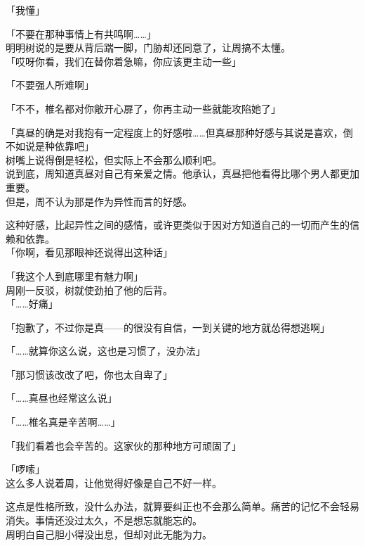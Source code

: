 「我懂」

「不要在那种事情上有共鸣啊……」\\

明明树说的是要从背后踹一脚，门胁却还同意了，让周搞不太懂。\\

「哎呀你看，我们在替你着急嘛，你应该更主动一些」

「不要强人所难啊」

「不不，椎名都对你敞开心扉了，你再主动一些就能攻陷她了」

「真昼的确是对我抱有一定程度上的好感啦……但真昼那种好感与其说是喜欢，倒不如说是种依靠吧」\\

树嘴上说得倒是轻松，但实际上不会那么顺利吧。\\

说到底，周知道真昼对自己有亲爱之情。他承认，真昼把他看得比哪个男人都更加重要。\\

但是，周不认为那是作为异性而言的好感。

这种好感，比起异性之间的感情，或许更类似于因对方知道自己的一切而产生的信赖和依靠。\\

「你啊，看见那眼神还说得出这种话」

「我这个人到底哪里有魅力啊」\\

周刚一反驳，树就使劲拍了他的后背。\\

「……好痛」

「抱歉了，不过你是真——的很没有自信，一到关键的地方就怂得想逃啊」

「……就算你这么说，这也是习惯了，没办法」

「那习惯该改改了吧，你也太自卑了」

「……真昼也经常这么说」

「……椎名真是辛苦啊……」

「我们看着也会辛苦的。这家伙的那种地方可顽固了」

「啰嗦」\\

这么多人说着周，让他觉得好像是自己不好一样。

这点是性格所致，没什么办法，就算要纠正也不会那么简单。痛苦的记忆不会轻易消失。事情还没过太久，不是想忘就能忘的。\\

周明白自己胆小得没出息，但却对此无能为力。\\


